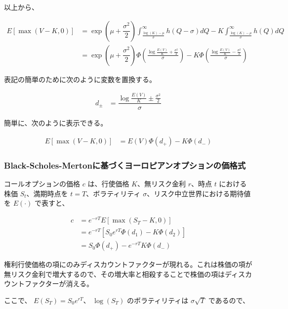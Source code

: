 \documentclass[uplatex]{jsarticle}
\begin{document}
以上から、

\begin{align}
	E \left[ \max(V-K,0) \right] & = \exp( \mu + \dfrac{\sigma^{2} }{2}) \int^{\infty}_{\frac{\log(K) - \mu}{\sigma}} h(Q - \sigma) dQ - K \int^{\infty}_{\frac{\log(K) - \mu}{\sigma}} h(Q) dQ                                              \\
	                             & = \exp( \mu + \dfrac{\sigma^{2} }{2}) \Phi \left( \frac{ \log \frac{E(V)}{K} + \frac{\sigma^{2}}{2} }{\sigma} \right) - K \Phi \left( \frac{ \log \frac{E(V)}{K} - \frac{\sigma^{2}}{2} }{\sigma} \right)
\end{align}

表記の簡単のために次のように変数を置換する。

\begin{align}
	d_{\pm} & = \dfrac{ \log \frac{E(V)}{K} \pm \frac{\sigma^{2}}{2} }{ \sigma }
\end{align}

簡単に、次のように表示できる。

\begin{align}
	E \left[ \max(V-K,0) \right] & = E(V) \Phi (d_{+}) - K \Phi (d_{-})
\end{align}


\subsubsection{Black-Scholes-Mertonに基づくヨーロピアンオプションの価格式}

コールオプションの価格 $c$ は、行使価格 $K$、無リスク金利 $r$、時点 $t$ における株価 $S_{t}$、満期時点を $t=T$、ボラティリティ $\sigma$、リスク中立世界における期待値を $E( \cdot )$ で表すと、

\begin{align}
	c & = e^{-rT} E \left[ \max(S_{T}-K,0) \right]                         \\
	  & = e^{-rT} \left[ S_{0} e^{rT} \Phi (d_{1}) - K \Phi(d_{2}) \right] \\
	  & = S_{0} \Phi (d_{+}) - e^{-rT} K \Phi(d_{-})
\end{align}

権利行使価格の項にのみディスカウントファクターが現れる。これは株価の項が無リスク金利で増大するので、その増大率と相殺することで株価の項はディスカウントファクターが消える。

ここで、
$E(S_{T}) = S_{0} e^{rT}$、
$\log(S_{T})$ のボラティリティは $\sigma \sqrt{T}$ であるので、
\end{document}

